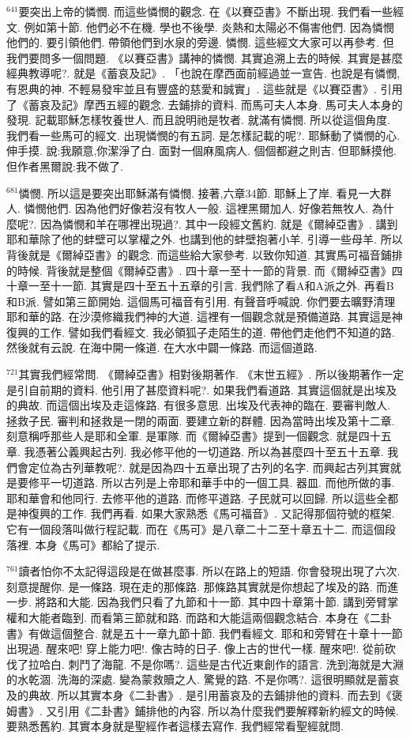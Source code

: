 \documentclass{book}
\begin{document}
$^{641}$要突出上帝的憐憫.
而這些憐憫的觀念.
在《以賽亞書》不斷出現.
我們看一些經文.
例如第十節.
他們必不在機.
學也不後學.
炎熱和太陽必不傷害他們.
因為憐憫他們的.
要引領他們.
帶領他們到水泉的旁邊.
憐憫.
這些經文大家可以再參考.
但我們要問多一個問題.
《以賽亞書》講神的憐憫.
其實追溯上去的時候.
其實是甚麼經典教導呢?.
就是《蓄哀及記》.
「也說在摩西面前經過並一宣告.
也說是有憐憫,有恩典的神.
不輕易發牢並且有豐盛的慈愛和誠實」.
這些就是《以賽亞書》.
引用了《蓄哀及記》摩西五經的觀念.
去鋪排的資料.
而馬可夫人本身.
馬可夫人本身的發現.
記載耶穌怎樣牧養世人.
而且說明祂是牧者.
就滿有憐憫.
所以從這個角度.
我們看一些馬可的經文.
出現憐憫的有五詞.
是怎樣記載的呢?.
耶穌動了憐憫的心.
伸手摸.
說:我願意,你潔淨了白.
面對一個麻風病人.
個個都避之則吉.
但耶穌摸他.
但作者黑爾說:我不做了.

$^{681}$憐憫.
所以這是要突出耶穌滿有憐憫.
接著,六章34節.
耶穌上了岸.
看見一大群人.
憐憫他們.
因為他們好像若沒有牧人一般.
這裡黑爾加人.
好像若無牧人.
為什麼呢?.
因為憐憫和羊在哪裡出現過?.
其中一段經文舊約.
就是《爾綽亞書》.
講到耶和華除了他的蚌壁可以掌權之外.
也講到他的蚌壁抱著小羊.
引導一些母羊.
所以背後就是《爾綽亞書》的觀念.
而這些給大家參考.
以致你知道.
其實馬可福音鋪排的時候.
背後就是整個《爾綽亞書》.
四十章一至十一節的背景.
而《爾綽亞書》四十章一至十一節.
其實是四十至五十五章的引言.
我們除了看A和A派之外.
再看B和B派.
譬如第三節開始.
這個馬可福音有引用.
有聲音呼喊說.
你們要去曠野清理耶和華的路.
在沙漠修織我們神的大道.
這裡有一個觀念就是預備道路.
其實這是神復興的工作.
譬如我們看經文.
我必領狐子走陌生的道.
帶他們走他們不知道的路.
然後就有云說.
在海中開一條道.
在大水中闢一條路.
而這個道路.

$^{721}$其實我們經常問.
《爾綽亞書》相對後期著作.
《末世五經》.
所以後期著作一定是引自前期的資料.
他引用了甚麼資料呢?.
如果我們看道路.
其實這個就是出埃及的典故.
而這個出埃及走這條路.
有很多意思.
出埃及代表神的臨在.
要審判敵人.
拯救子民.
審判和拯救是一閉的兩面.
要建立新的群體.
因為當時出埃及第十二章.
刻意稱呼那些人是耶和全軍.
是軍隊.
而《爾綽亞書》提到一個觀念.
就是四十五章.
我憑著公義興起古列.
我必修平他的一切道路.
所以為甚麼四十至五十五章.
我們會定位為古列華教呢?.
就是因為四十五章出現了古列的名字.
而興起古列其實就是要修平一切道路.
所以古列是上帝耶和華手中的一個工具.
器皿.
而他所做的事.
耶和華會和他同行.
去修平他的道路.
而修平道路.
子民就可以回歸.
所以這些全都是神復興的工作.
我們再看.
如果大家熟悉《馬可福音》.
又記得那個符號的框架.
它有一個段落叫做行程記載.
而在《馬可》是八章二十二至十章五十二.
而這個段落裡.
本身《馬可》都給了提示.

$^{761}$讀者怕你不太記得這段是在做甚麼事.
所以在路上的短語.
你會發現出現了六次.
刻意提醒你.
是一條路.
現在走的那條路.
那條路其實就是你想起了埃及的路.
而進一步.
將路和大能.
因為我們只看了九節和十一節.
其中四十章第十節.
講到旁臂掌權和大能者臨到.
而看第三節就和路.
而路和大能這兩個觀念結合.
本身在《二卦書》有做這個整合.
就是五十一章九節十節.
我們看經文.
耶和和旁臂在十章十一節出現過.
醒來吧! 穿上能力吧!.
像古時的日子.
像上古的世代一樣.
醒來吧!.
從前砍伐了拉哈白.
刺鬥了海龍.
不是你嗎?.
這些是古代近東創作的語言.
洗到海就是大淵的水乾涸.
洗海的深處.
變為蒙救贖之人.
驚覺的路.
不是你嗎?.
這很明顯就是蓄哀及的典故.
所以其實本身《二卦書》.
是引用蓄哀及的去鋪排他的資料.
而去到《褒姆書》.
又引用《二卦書》鋪排他的內容.
所以為什麼我們要解釋新約經文的時候.
要熟悉舊約.
其實本身就是聖經作者這樣去寫作.
我們經常看聖經就問.
\end{document}
